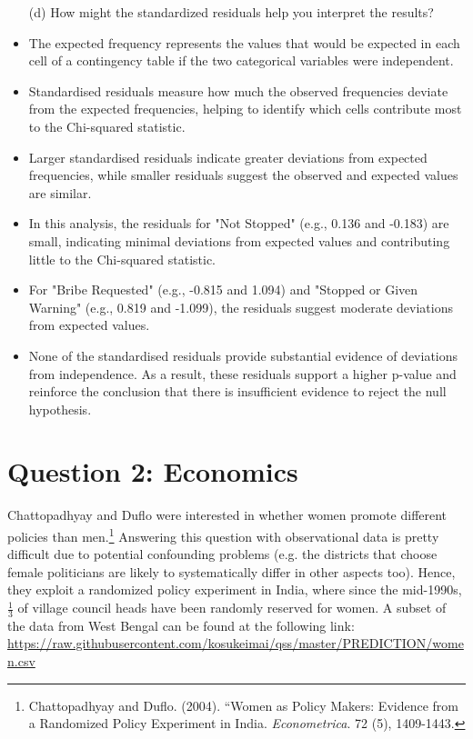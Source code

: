 \documentclass[12pt,letterpaper]{article}
\begin{document}
\newpage
\begin{enumerate}
	\item [(d)] How might the standardized residuals help you interpret the results?  	
\end{enumerate}

\begin{itemize}
	\item 
	 The expected frequency represents the values that would be expected in each cell of a contingency table if the two categorical variables were independent.
	\item
	Standardised residuals measure how much the observed frequencies deviate from the expected frequencies, helping to identify which cells contribute most to the Chi-squared statistic. 
	\item 
	Larger standardised residuals indicate greater deviations from expected frequencies, while smaller residuals suggest the observed and expected values are similar.
	\item 
	In this analysis, the residuals for "Not Stopped" (e.g., 0.136 and -0.183) are small, indicating minimal deviations from expected values and contributing little to the Chi-squared statistic. 
	\item 
	For "Bribe Requested" (e.g., -0.815 and 1.094) and "Stopped or Given Warning" (e.g., 0.819 and -1.099), the residuals suggest moderate deviations from expected values.
	\item 
	None of the standardised residuals provide substantial evidence of deviations from independence. As a result, these residuals support a higher p-value and reinforce the conclusion that there is insufficient evidence to reject the null hypothesis.
\end{itemize}

\newpage
\section*{Question 2: Economics}
Chattopadhyay and Duflo were interested in whether women promote different policies than men.\footnote{Chattopadhyay and Duflo. (2004). ``Women as Policy Makers: Evidence from a Randomized Policy Experiment in India. \textit{Econometrica}. 72 (5), 1409-1443.} Answering this question with observational data is pretty difficult due to potential confounding problems (e.g. the districts that choose female politicians are likely to systematically differ in other aspects too). Hence, they exploit a randomized policy experiment in India, where since the mid-1990s, $\frac{1}{3}$ of village council heads have been randomly reserved for women. A subset of the data from West Bengal can be found at the following link: \url{https://raw.githubusercontent.com/kosukeimai/qss/master/PREDICTION/women.csv}\\
\end{document}
